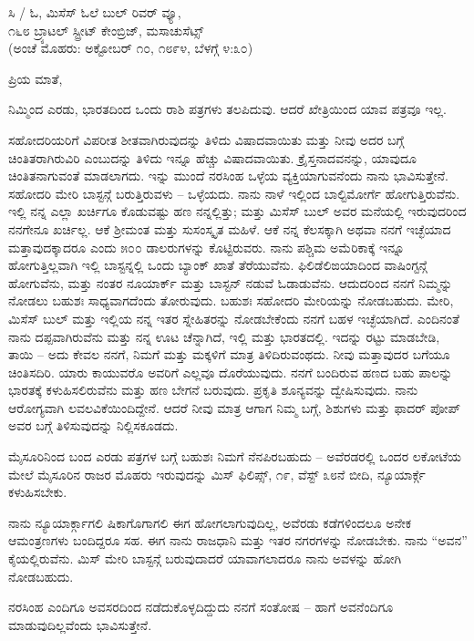 \begin{flushright}
ಸಿ / ಓ, ಮಿಸೆಸ್ ಓಲೆ ಬುಲ್ ರಿವರ್ ವ್ಯೂ,\\೧೬೮ ಬ್ರ್ಯಾಟಲ್ ಸ್ಟ್ರೀಟ್ ಕೇಂಬ್ರಿಜ್, ಮಸಾಚುಸೆಟ್ಸ್\\(ಅಂಚೆ ಮೊಹರು: ಅಕ್ಟೋಬರ್ ೧೦, ೧೮೯೪, ಬೆಳಗ್ಗೆ ೪:೩೦)
\end{flushright}

ಪ್ರಿಯ ಮಾತೆ,

ನಿಮ್ಮಿಂದ ಎರಡು, ಭಾರತದಿಂದ ಒಂದು ರಾಶಿ ಪತ್ರಗಳು ತಲಪಿದುವು. ಆದರೆ ಖೇತ್ರಿಯಿಂದ ಯಾವ ಪತ್ರವೂ ಇಲ್ಲ.

ಸಹೋದರಿಯರಿಗೆ ವಿಪರೀತ ಶೀತವಾಗಿರುವುದನ್ನು ತಿಳಿದು ವಿಷಾದವಾಯಿತು ಮತ್ತು ನೀವು ಅದರ ಬಗ್ಗೆ ಚಿಂತಿತರಾಗಿರುವಿರಿ ಎಂಬುದನ್ನು ತಿಳಿದು ಇನ್ನೂ ಹೆಚ್ಚು ವಿಷಾದವಾಯಿತು. ಕ್ರೈಸ್ತನಾದವನನ್ನು, ಯಾವುದೂ ಚಿಂತಿತನಾಗುವಂತೆ ಮಾಡಲಾಗದು. ಇನ್ನು ಮುಂದೆ ನರಸಿಂಹ ಒಳ್ಳೆಯ ವ್ಯಕ್ತಿಯಾಗುವನೆಂದು ನಾನು ಭಾವಿಸುತ್ತೇನೆ. ಸಹೋದರಿ ಮೇರಿ ಬಾಸ್ಟನ್ಗೆ ಬರುತ್ತಿರುವಳು – ಒಳ್ಳೆಯದು. ನಾನು ನಾಳೆ ಇಲ್ಲಿಂದ ಬಾಲ್ಟಿಮೋರ್ಗೆ ಹೋಗುತ್ತಿರುವೆನು. ಇಲ್ಲಿ ನನ್ನ ಎಲ್ಲಾ ಖರ್ಚಿಗೂ ಕೊಡುವಷ್ಟು ಹಣ ನನ್ನಲ್ಲಿತ್ತು; ಮತ್ತು ಮಿಸೆಸ್ ಬುಲ್ ಅವರ ಮನೆಯಲ್ಲಿ ಇರುವುದರಿಂದ ನನಗೇನೂ ಖರ್ಚಿಲ್ಲ. ಆಕೆ ಶ‍್ರೀಮಂತ ಮತ್ತು ಸುಸಂಸ್ಕೃತ ಮಹಿಳೆ. ಆಕೆ ನನ್ನ ಕೆಲಸಕ್ಕಾಗಿ ಅಥವಾ ನನಗೆ ಇಚ್ಛೆಯಾದ ಮತ್ತಾವುದಕ್ಕಾದರೂ ಎಂದು ೫೦೦ ಡಾಲರುಗಳನ್ನು ಕೊಟ್ಟಿರುವರು. ನಾನು ಪಶ್ಚಿಮ ಅಮೆರಿಕಾಕ್ಕೆ ಇನ್ನೂ ಹೋಗುತ್ತಿಲ್ಲವಾಗಿ ಇಲ್ಲಿ ಬಾಸ್ಟನ್ನಲ್ಲಿ ಒಂದು ಬ್ಯಾಂಕ್ ಖಾತೆ ತೆರೆಯುವೆನು. ಫಿಲಿಡೆಲಿಙಯಾದಿಂದ ವಾಷಿಂಗ್ಟನ್ಗೆ ಹೋಗುವೆನು, ಮತ್ತು ನಂತರ ನೂಯಾರ್ಕ್ ಮತ್ತು ಬಾಸ್ಟನ್ ನಡುವೆ ಓಡಾಡುವೆನು. ಆದುದರಿಂದ ನನಗೆ ನಿಮ್ಮನ್ನು ನೋಡಲು ಬಹುಶಃ ಸಾಧ್ಯವಾಗದೆಂದು ತೋರುವುದು. ಬಹುಶಃ ಸಹೋದರಿ ಮೇರಿಯನ್ನು ನೋಡಬಹುದು. ಮೇರಿ, ಮಿಸೆಸ್ ಬುಲ್ ಮತ್ತು ಇಲ್ಲಿಯ ನನ್ನ ಇತರ ಸ್ನೇಹಿತರನ್ನು ನೋಡಬೇಕೆಂದು ನನಗೆ ಬಹಳ ಇಚ್ಛೆಯಾಗಿದೆ. ಎಂದಿನಂತೆ ನಾನು ದಪ್ಪವಾಗಿರುವೆನು ಮತ್ತು ನನ್ನ ಊಟ ಚೆನ್ನಾಗಿದೆ, ಇಲ್ಲಿ ಮತ್ತು ಭಾರತದಲ್ಲಿ. ಇದನ್ನು ರಟ್ಟು ಮಾಡಬೇಡಿ, ತಾಯಿ – ಅದು ಕೇವಲ ನನಗೆ, ನಿಮಗೆ ಮತ್ತು ಮಕ್ಕಳಿಗೆ ಮಾತ್ರ ತಿಳಿದಿರುವಂಥದು. ನೀವು ಮತ್ತಾವುದರ ಬಗೆಯೂ ಚಿಂತಿಸದಿರಿ. ಯಾರು ಕಾಯುವರೊ ಅವರಿಗೆ ಎಲ್ಲವೂ ದೊರೆಯುವುದು. ನನಗೆ ಬಂದಿರುವ ಹಣದ ಬಹು ಪಾಲನ್ನು ಭಾರತಕ್ಕೆ ಕಳುಹಿಸಲಿರುವೆನು ಮತ್ತು ಹಣ ಬೇಗನೆ ಬರುವುದು. ಪ್ರಕೃತಿ ಶೂನ್ಯವನ್ನು ದ್ವೇಷಿಸುವುದು. ನಾನು ಆರೋಗ್ಯವಾಗಿ ಲವಲವಿಕೆಯಿಂದಿದ್ದೇನೆ. ಆದರೆ ನೀವು ಮಾತ್ರ ಆಗಾಗ ನಿಮ್ಮ ಬಗ್ಗೆ, ಶಿಶುಗಳು ಮತ್ತು ಫಾದರ್ ಪೋಪ್ ಅವರ ಬಗ್ಗೆ ತಿಳಿಸುವುದನ್ನು ನಿಲ್ಲಿಸಕೂಡದು.

ಮೈಸೂರಿನಿಂದ ಬಂದ ಎರಡು ಪತ್ರಗಳ ಬಗ್ಗೆ ಬಹುಶಃ ನಿಮಗೆ ನೆನಪಿರಬಹುದು – ಅವೆರಡರಲ್ಲಿ ಒಂದರ ಲಕೋಟೆಯ ಮೇಲೆ ಮೈಸೂರಿನ ರಾಜರ ಮೊಹರು ಇರುವುದನ್ನು ಮಿಸ್ ಫಿಲಿಪ್ಸ್, ೧೯, ವೆಸ್ಟ್ ೩೮ನೆ ಬೀದಿ, ನ್ಯೂಯಾರ್ಕ್ಗೆ ಕಳುಹಿಸಬೇಕು.

ನಾನು ನ್ಯೂಯಾರ್ಕ್ಗಾಗಲಿ ಷಿಕಾಗೊಗಾಗಲಿ ಈಗ ಹೋಗಲಾಗುವುದಿಲ್ಲ, ಅವೆರಡು ಕಡೆಗಳಿಂದಲೂ ಅನೇಕ ಆಮಂತ್ರಣಗಳು ಬಂದಿದ್ದರೂ ಸಹ. ಈಗ ನಾನು ರಾಜಧಾನಿ ಮತ್ತು ಇತರ ನಗರಗಳನ್ನು ನೋಡಬೇಕು. ನಾನು “ಅವನ” ಕೈಯಲ್ಲಿರುವೆನು. ಮಿಸ್ ಮೇರಿ ಬಾಸ್ಟನ್ಗೆ ಬರುವುದಾದರೆ ಯಾವಾಗಲಾದರೂ ನಾನು ಅವಳನ್ನು ಹೋಗಿ ನೋಡಬಹುದು.

ನರಸಿಂಹ ಎಂದಿಗೂ ಅವಸರದಿಂದ ನಡೆದುಕೊಳ್ಳದಿದ್ದುದು ನನಗೆ ಸಂತೋಷ – ಹಾಗೆ ಅವನೆಂದಿಗೂ ಮಾಡುವುದಿಲ್ಲವೆಂದು ಭಾವಿಸುತ್ತೇನೆ.


